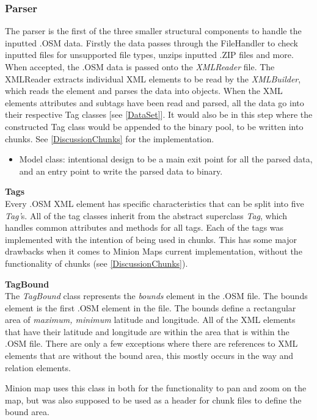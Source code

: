 \subsubsection{Parser}\label{section/parser}
The parser is the first of the three smaller structural components to handle the inputted .OSM data. Firstly the data passes through the FileHandler to check inputted files for unsupported file types, unzips inputted .ZIP files and more. When accepted, the .OSM data is passed onto the \textit{XMLReader} file. The XMLReader extracts individual XML elements to be read by the \textit{XMLBuilder}, which reads the element and parses the data into objects. When the XML elements attributes and subtags have been read and parsed, all the data go into their respective Tag classes [see \ref{DataSet}]. 
It would also be in this step where the constructed Tag class would be appended to the binary pool, to be written into chunks. See \ref{DiscussionChunks} for the implementation.
\begin{itemize}
    \item Model class: intentional design to be a main exit point for all the parsed data, and an entry point to write the parsed data to binary. 
 
\end{itemize}

\textbf{Tags}\\
Every .OSM XML element has specific characteristics that can be split into five \textit{Tag’}s. All of the tag classes inherit from the abstract superclass \textit{Tag}, which handles common attributes and methods for all tags.
Each of the tags was implemented with the intention of being used in chunks. This has some major drawbacks when it comes to Minion Maps current implementation, without the functionality of chunks (see \ref{DiscussionChunks}).

\textbf{TagBound}\\
The \textit{TagBound }class represents the \textit{bounds }element in the .OSM file. The bounds element is the first .OSM element in the file. The bounds define a rectangular area of \textit{maximum, minimum }latitude and longitude. All of the XML elements that have their latitude and longitude are within the area that is within the .OSM file. There are only a few exceptions where there are references to XML elements that are without the bound area, this mostly occurs in the way and relation elements.

Minion map uses this class in both for the functionality to pan and zoom on the map, but was also supposed to be used as a header for chunk files to define the bound area.

